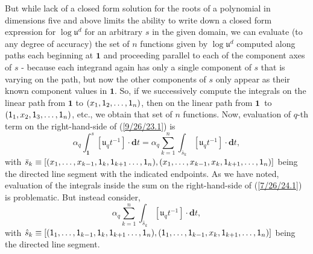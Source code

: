 \documentclass{amsart}
\numberwithin{equation}{section}
\theoremstyle{definition}
\numberwithin{theorem}{section}
\begin{document}
But while lack of a closed form solution for the roots of a polynomial in dimensions five and above limits the ability to write down a closed form expression for $\log\mathfrak{u}^d$ for an arbitrary $s$ in the given domain, we can evaluate (to any degree of accuracy) the set of $n$ functions given by $\log\mathfrak{u}^d$ computed along paths each beginning at $\mathbf{1}$ and proceeding parallel to each of the component axes of $s$ - because each integrand again has only a single component of $s$ that is varying on the path, but now the other components of $s$ only appear as their known component values in $\mathbf{1}$.  
So, if we successively compute the integrals on the linear path from $\mathbf{1}$ to $(x_1,{\sf 1}_2,\dots,{\sf 1}_n)$, then on the linear path from \mbox{$\mathbf{1}$ to} $({\sf 1}_1,x_2,{\sf 1}_3,\dots,{\sf 1}_n)$, etc., we obtain that set of $n$ functions. 
 Now, evaluation of $q$-th term on the right-hand-side of (\ref{9/26/23.1}) is \begin{equation}\label{7/26/24.1} \alpha_q\int_{\mathbf{1}}^s [\mathfrak{u}_q t^{-1}]\cdot \mathbf{d}t = \alpha_q\sum_{k=1}^n \int_{\bar{s}_k} [\mathfrak{u}_q t^{-1}]\cdot \mathbf{d}t,\end{equation} with $\bar{s}_k \equiv [(x_1,\dots,x_{k-1},{\sf 1}_{k},{\sf 1}_{k+1}\dots,{\sf 1}_n),(x_1,\dots,x_{k-1},x_k,{\sf 1}_{k+1},\dots,{\sf 1}_n)]$ being the directed line segment with the indicated endpoints.   As we have noted, evaluation of the integrals inside the sum on the right-hand-side of (\ref{7/26/24.1}) is problematic.  But instead consider,  \begin{equation}\label{7/26/24.2}\alpha_q\sum_{k=1}^n \int_{\hat{s}_k} [\mathfrak{u}_q t^{-1}]\cdot \mathbf{d}t,\end{equation} with $\hat{s}_k \equiv [({\sf 1}_1,\dots,{\sf 1}_{k-1},{\sf 1}_{k},{\sf 1}_{k+1}\dots,{\sf 1}_n),({\sf 1}_1,\dots,{\sf 1}_{k-1},x_k,{\sf 1}_{k+1},\dots,{\sf 1}_n)]$ being the directed line segment. 
\end{document}
